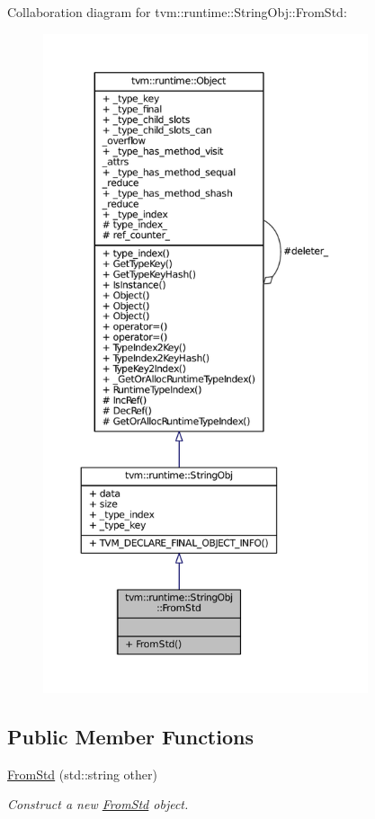Collaboration diagram for tvm\+:\+:runtime\+:\+:String\+Obj\+:\+:From\+Std\+:
\nopagebreak
\begin{figure}[H]
\begin{center}
\leavevmode
\includegraphics[height=550pt]{classtvm_1_1runtime_1_1StringObj_1_1FromStd__coll__graph}
\end{center}
\end{figure}
\subsection*{Public Member Functions}
\begin{DoxyCompactItemize}
\item 
\hyperlink{classtvm_1_1runtime_1_1StringObj_1_1FromStd_ae16447bf3dfb1874dc8e04633ba820b4}{From\+Std} (std\+::string other)
\begin{DoxyCompactList}\small\item\em Construct a new \hyperlink{classtvm_1_1runtime_1_1StringObj_1_1FromStd}{From\+Std} object. \end{DoxyCompactList}\end{DoxyCompactItemize}

